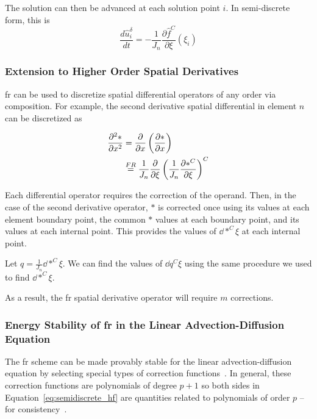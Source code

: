 The solution can then be advanced at each solution point $i$. In semi-discrete form, this is
\begin{equation}\label{eq:semidiscrete_hf}
\frac{d \hat{u}_i^\delta}{d t} = - \frac{1}{J_n}\frac{\partial \hat{f}^C}{\partial \xi}(\xi_i)
\end{equation}

\subsubsection{Extension to Higher Order Spatial Derivatives}

\gls{fr} can be used to discretize spatial differential operators of any order via composition. For example, the second derivative spatial differential in element $n$ can be discretized as

\begin{equation}
\begin{aligned}
\frac{\partial^2 *}{\partial x^2} &= {\frac{\partial }{\partial x}}\left({\frac{\partial *}{\partial x}}\right)\\
& \stackrel{FR}{=} \frac{1}{J_n} {\frac{\partial }{\partial \xi}}\left( \frac{1}{J_n} {\frac{\partial *^C}{\partial \xi}}\right)^C
\end{aligned}
\end{equation}

Each differential operator requires the correction of the operand. Then, in the case of the second derivative operator, $*$ is corrected once using its values at each element boundary point, the common $*$ values at each boundary point, and its values at each internal point. This provides the values of $\dd{*^C}{\xi}$ at each internal point.

Let $q = \frac{1}{J_n} \dd{*^C}{\xi}$. We can find the values of $\dd{q^C}{\xi}$ using the same procedure we used to find $\dd{*^C}{\xi}$.

As a result, the  \gls{fr} spatial derivative operator will require $m$ corrections.

\subsubsection{Energy Stability of \gls{fr} in the Linear Advection-Diffusion Equation}
The \gls{fr} scheme can be made provably stable for the linear advection-diffusion equation by selecting special types of correction functions~\cite{castonguay2013energy}. In general, these correction functions are polynomials of degree $p+1$ so both sides in Equation~\eqref{eq:semidiscrete_hf} are quantities related to polynomials of order $p$ --for consistency~\cite{huynh2007flux}.

